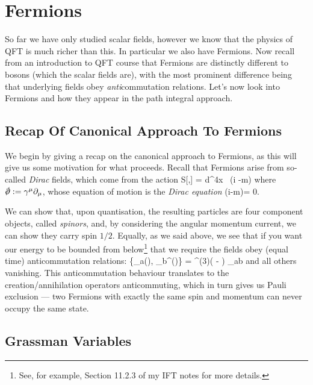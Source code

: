 \chapter{Fermions}


So far we have only studied scalar fields, however we know that the physics of QFT is much richer than this. In particular we also have Fermions. Now recall from an introduction to QFT course that Fermions are distinctly different to bosons (which the scalar fields are), with the most prominent difference being that underlying fields obey \textit{anti}commutation relations. Let's now look into Fermions and how they appear in the path integral approach. 

\section{Recap Of Canonical Approach To Fermions}

We begin by giving a recap on the canonical approach to Fermions, as this will give us some motivation for what proceeds. Recall that Fermions arise from so-called \textit{Dirac} fields, which come from the action
\bse 
    S[\psi,\overline{\psi}] = \int d^4x \, \overline{\psi}(i\slashed{\p} -m) \psi 
\ese 
where $\slashed{\p} := \g^{\mu}\p_{\mu}$, whose equation of motion is the \textit{Dirac equation}
\bse 
    (i\slashed{\p}-m)\psi = 0.
\ese 

We can show that, upon quantisation, the resulting particles are four component objects, called \textit{spinors}, and, by considering the angular momentum current, we can show they carry spin $1/2$. Equally, as we said above, we see that if you want our energy to be bounded from below\footnote{See, for example, Section 11.2.3 of my IFT notes for more details.} that we require the fields obey (equal time) anticommutation relations:
\bse 
    \{\psi_a(), \psi_b^{\dagger}()\} = \del^{(3)}( - ) \del_{ab}
\ese 
and all others vanishing. This anticommutation behaviour translates to the creation/annihilation operators anticommuting, which in turn gives us Pauli exclusion --- two Fermions with exactly the same spin and momentum can never occupy the same state. 


\section{Grassman Variables}

